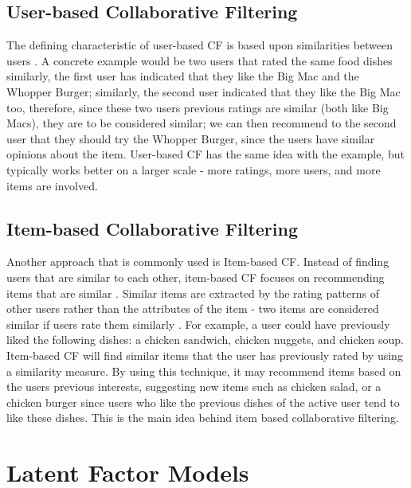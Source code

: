 \subsection{User-based Collaborative Filtering}

The defining characteristic of user-based CF is based upon similarities between users \cite{mahoutaction}. A concrete example would be two users that rated the same food dishes similarly, the first user has indicated that they like the Big Mac and the Whopper Burger; similarly, the second user indicated that they like the Big Mac too, therefore, since these two users previous ratings are similar (both like Big Macs), they are to be considered similar; we can then recommend to the second user that they should try the Whopper Burger, since the users have similar opinions about the item. User-based CF has the same idea with the example, but typically works better on a larger scale - more ratings, more users, and more items are involved. 


\subsection{Item-based Collaborative Filtering}

Another approach that is commonly used is Item-based CF. Instead of finding users that are similar to each other, item-based CF focuses on recommending items that are similar \cite{mahoutaction}. Similar items are extracted by the rating patterns of other users rather than the attributes of the item - two items are considered similar if users rate them similarly \cite{schafer2007collaborative}. For example, a user could have previously liked the following dishes: a chicken sandwich, chicken nuggets, and chicken soup. Item-based CF will find similar items that the user has previously rated by using a similarity measure. By using this technique, it may recommend items based on the users previous interests, suggesting new items such as chicken salad, or a chicken burger since users who like the previous dishes of the active user tend to like these dishes. This is the main idea behind item based collaborative filtering. 


\section{Latent Factor Models}



